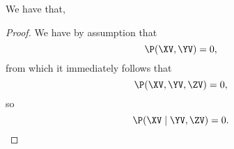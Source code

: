 \begin{proposition}
  We have that, %
\end{proposition}

\begin{proof}
  We have by assumption that
  $$\P(\XV, \YV) = 0,$$
  from which it immediately follows that
  $$\P(\XV, \YV, \ZV) = 0,$$
  so
  $$\P(\XV \mid \YV, \ZV) = 0.$$%
\end{proof}
